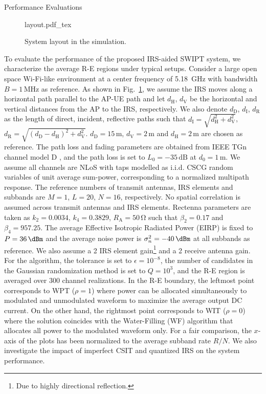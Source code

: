 \documentclass[journal]{IEEEtran}
\begin{document}
	\begin{section}{Performance Evaluations}\label{se:performance_evaluation}
		\begin{figure}[!t]
			\centering
			\def\svgwidth{0.9\columnwidth}
			{layout.pdf_tex}
			\caption{System layout in the simulation.}
			\label{fi:layout}
		\end{figure}
		To evaluate the performance of the proposed IRS-aided SWIPT system, we characterize the average R-E regions under typical setups. Consider a large open space Wi-Fi-like environment at a center frequency of \SI{5.18}{\GHz} with bandwidth $B=1\,\si{\MHz}$ as reference. As shown in Fig.~\ref{fi:layout}, we assume the IRS moves along a horizontal path parallel to the AP-UE path and let $d_{\mathrm{H}}$, $d_{\mathrm{V}}$ be the horizontal and vertical distances from the AP to the IRS, respectively. We also denote $d_{\mathrm{D}}$, $d_{\mathrm{I}}$, $d_{\mathrm{R}}$ as the length of direct, incident, reflective paths such that $d_{\mathrm{I}}=\sqrt{d_{\mathrm{H}}^2+d_{\mathrm{V}}^2}$, $d_{\mathrm{R}}=\sqrt{(d_{\mathrm{D}}-d_{\mathrm{H}})^2+d_{\mathrm{V}}^2}$. $d_{\mathrm{D}}=15\,\si{\meter}$, $d_{\mathrm{V}}=2\,\si{\meter}$ and $d_{\mathrm{H}}=2\,\si{\meter}$ are chosen as reference. The path loss and fading parameters are obtained from IEEE TGn channel model D \cite{Erceg2004}, and the path loss is set to $L_0=-35\,\si{\dB}$ at $d_0=1\,\si{\meter}$. We assume all channels are NLoS with taps modelled as i.i.d. CSCG random variables of unit average sum-power, corresponding to a normalized multipath response. The reference numbers of transmit antennas, IRS elements and subbands are $M=1$, $L=20$, $N=16$, respectively. No spatial correlation is assumed across transmit antennas and IRS elements. Rectenna parameters are taken as $k_2=0.0034$, $k_4=0.3829$, $R_{\mathrm{A}}=50\,\si{\ohm}$ such that $\beta_2=0.17$ and $\beta_4=957.25$. The average Effective Isotropic Radiated Power (EIRP) is fixed to $P=36\,\si{\dBm}$ and the average noise power is $\sigma_n^2=-40\,\si{\dBm}$ at all subbands as reference. We also assume a \SI{2}{\dBi} IRS element gain\footnote{Due to highly directional reflection.} and a \SI{2}{\dBi} receive antenna gain. For the algorithm, the tolerance is set to $\epsilon=10^{-8}$, the number of candidates in the Gaussian randomization method is set to $Q=10^{3}$, and the R-E region is averaged over \num{300} channel realizations. In the R-E boundary, the leftmost point corresponds to WPT ($\rho=1$) where power can be allocated simultaneously to modulated and unmodulated waveform to maximize the average output DC current. On the other hand, the rightmost point corresponds to WIT ($\rho=0$) where the solution coincides with the Water-Filling (WF) algorithm that allocates all power to the modulated waveform only. For a fair comparison, the $x$-axis of the plots has been normalized to the average subband rate $R/N$. We also investigate the impact of imperfect CSIT and quantized IRS on the system performance.


\end{section}
\end{document}

